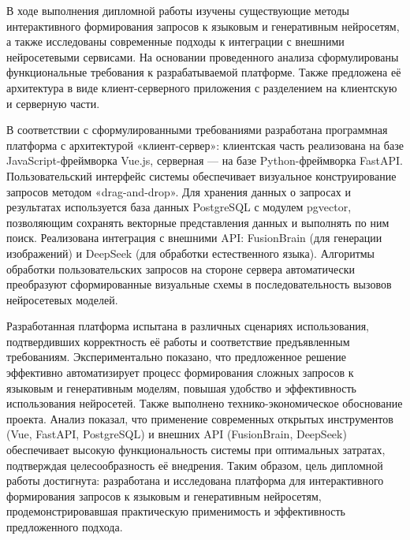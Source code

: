 
В ходе выполнения дипломной работы изучены существующие методы интерактивного формирования запросов к языковым и генеративным нейросетям, а также исследованы современные подходы к интеграции с внешними нейросетевыми сервисами. На основании проведенного анализа сформулированы функциональные требования к разрабатываемой платформе. Также предложена её архитектура в виде клиент-серверного приложения с разделением на клиентскую и серверную части.

В соответствии с сформулированными требованиями разработана программная платформа с архитектурой «клиент-сервер»: клиентская часть реализована на базе JavaScript-фреймворка Vue.js, серверная — на базе Python-фреймворка FastAPI. Пользовательский интерфейс системы обеспечивает визуальное конструирование запросов методом «drag-and-drop». Для хранения данных о запросах и результатах используется база данных PostgreSQL с модулем pgvector, позволяющим сохранять векторные представления данных и выполнять по ним поиск. Реализована интеграция с внешними API: FusionBrain (для генерации изображений) и DeepSeek (для обработки естественного языка). Алгоритмы обработки пользовательских запросов на стороне сервера автоматически преобразуют сформированные визуальные схемы в последовательность вызовов нейросетевых моделей.

Разработанная платформа испытана в различных сценариях использования, подтвердивших корректность её работы и соответствие предъявленным требованиям. Экспериментально показано, что предложенное решение эффективно автоматизирует процесс формирования сложных запросов к языковым и генеративным моделям, повышая удобство и эффективность использования нейросетей. Также выполнено технико-экономическое обоснование проекта. Анализ показал, что применение современных открытых инструментов (Vue, FastAPI, PostgreSQL) и внешних API (FusionBrain, DeepSeek) обеспечивает высокую функциональность системы при оптимальных затратах, подтверждая целесообразность её внедрения. Таким образом, цель дипломной работы достигнута: разработана и исследована платформа для интерактивного формирования запросов к языковым и генеративным нейросетям, продемонстрировавшая практическую применимость и эффективность предложенного подхода.